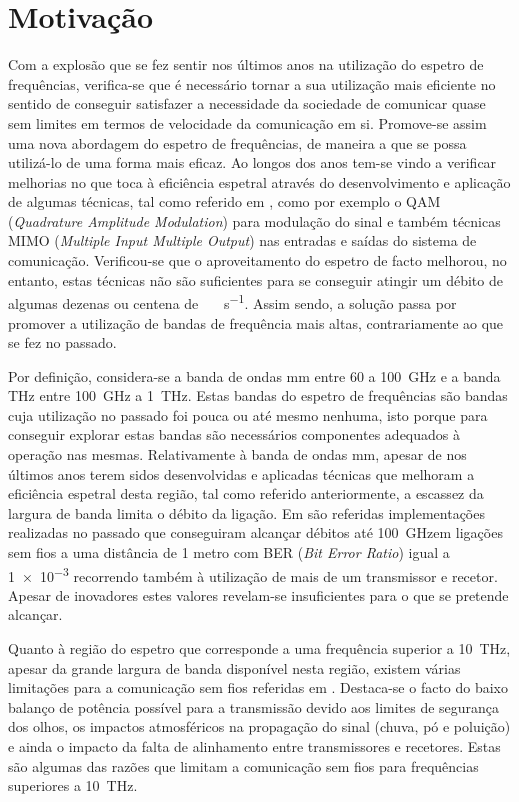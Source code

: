 \section{Motivação} \label{sec:goals}
Com a explosão que se fez sentir nos últimos anos na utilização do espetro de frequências, verifica-se que é necessário tornar a sua utilização mais eficiente no sentido de conseguir satisfazer a necessidade da sociedade de comunicar quase sem limites em termos de velocidade da comunicação em si. Promove-se assim uma nova abordagem do espetro de frequências, de maneira a que se possa utilizá-lo de uma forma mais eficaz.  
Ao longos dos anos tem-se vindo a verificar melhorias no que toca à eficiência espetral através do desenvolvimento e aplicação de algumas técnicas, tal como referido em \cite{R007}, como por exemplo o QAM (\textit{Quadrature Amplitude Modulation}) para modulação do sinal e também técnicas MIMO (\textit{Multiple Input Multiple Output}) nas entradas e saídas do sistema de comunicação. Verificou-se que o aproveitamento do espetro de facto melhorou, no entanto, estas técnicas não são suficientes para se conseguir atingir um débito de algumas dezenas ou centena de \SI{}{\giga\bit\per\second}. Assim sendo, a solução passa por promover a utilização de bandas de frequência mais altas, contrariamente ao que se fez no passado.  

Por definição, considera-se a banda de ondas mm entre 60 a \SI{100}{\giga\hertz} e a banda THz entre \SI{100}{\giga\hertz} a \SI{1}{\tera\hertz}. Estas bandas do espetro de frequências são bandas cuja utilização no passado foi pouca ou até mesmo nenhuma, isto porque para conseguir explorar estas bandas são necessários componentes adequados à operação nas mesmas. Relativamente à banda de ondas mm, apesar de nos últimos anos terem sidos desenvolvidas e aplicadas técnicas que melhoram a eficiência espetral desta região, tal como referido anteriormente, a escassez da largura de banda limita o débito da ligação. Em \cite{R007} são referidas implementações realizadas no passado que conseguiram alcançar débitos até  \SI{100}{\giga\hertz}em ligações sem fios a uma distância de 1 metro com BER (\textit{Bit Error Ratio}) igual a \num{1e-3} recorrendo também à utilização de mais de um transmissor e recetor. Apesar de inovadores estes valores revelam-se insuficientes para o que se pretende alcançar. 

Quanto à região do espetro que corresponde a uma frequência superior a \SI{10}{\tera\hertz}, apesar da grande largura de banda disponível nesta região, existem várias limitações para a comunicação sem fios referidas em \cite{R005}. Destaca-se o facto do baixo balanço de potência possível para a transmissão devido aos limites de segurança dos olhos, os impactos atmosféricos na propagação do sinal (chuva, pó e poluição) e ainda o impacto da falta de alinhamento entre transmissores e recetores. Estas são algumas das razões que limitam a comunicação sem fios para frequências superiores a \SI{10}{\tera\hertz}.

